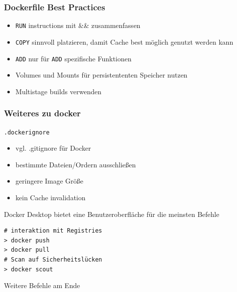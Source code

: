 \documentclass[22pt]{beamer}
\newcommand{\code}[1]{\colorbox{gray!10}{\texttt{#1}}}
\begin{document}
\begin{frame}[t]
    \frametitle{Dockerfile Best Practices}
    \begin{itemize}
        \item \code{RUN} instructions mit \&\& zusammenfassen
        \item \code{COPY} sinnvoll platzieren, damit Cache best möglich genutzt werden kann
        \item \code{ADD} nur für \code{ADD} spezifische Funktionen
        \item Volumes und Mounts für persistententen Speicher nutzen
        \item Multistage builds verwenden
    \end{itemize} 
\end{frame}

\begin{frame}[fragile]
    \frametitle{Weiteres zu docker}
    \code{.dockerignore}
    \begin{itemize}
        \item vgl. .gitignore für Docker
        \item bestimmte Dateien/Ordern ausschließen
        \item geringere Image Größe
        \item kein Cache invalidation
    \end{itemize}
    \medskip\pause
    Docker Desktop bietet eine Benutzeroberfläche für die meinsten Befehle\\\pause
    \begin{verbatim}
# interaktion mit Registries
> docker push
> docker pull 
# Scan auf Sicherheitslücken
> docker scout   
\end{verbatim}
Weitere Befehle am Ende
\end{frame}
\end{document}
